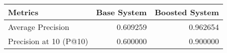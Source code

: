 \begin{tabular}{lrr}
\toprule
Metrics & Base System & Boosted System \\
\midrule
Average Precision & 0.609259 & 0.962654 \\
Precision at 10 (P@10) & 0.600000 & 0.900000 \\
\bottomrule
\end{tabular}
